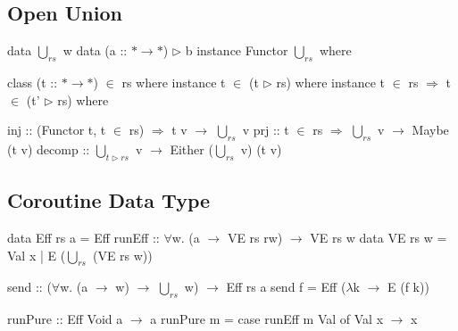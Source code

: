 \documentclass{article}
\newcommand{\U}{\bigcup\nolimits}
\begin{document}
\subsection*{Open Union}
\begin{code}
data $\U_{rs}$ w
data (a :: $* \to *$) $\rhd$ b
instance Functor  $\U_{rs}$ where

class (t :: $* \to *$) $\in$ rs where
instance t $\in$ (t $\rhd$ rs) where
instance t $\in$ rs $\Rightarrow$ t $\in$ (t' $\rhd$ rs) where

inj :: (Functor t, t $\in$ rs) $\Rightarrow$ t v $\to$ $\U_{rs}$ v
prj :: t $\in$ rs $\Rightarrow$ $\U_{rs}$ v $\to$ Maybe (t v)
decomp :: $\U_{t \rhd rs}$ v $\to$ Either ($\U_{rs}$ v) (t v)
\end{code}

\subsection*{Coroutine Data Type}
\begin{code}
data Eff rs a = Eff { runEff :: $\forall$w. (a $\to$ VE rs rw) $\to$ VE rs w }
data VE rs w = Val x
                     | E ($\U_{rs}$ (VE rs w))

send :: ($\forall$w. (a $\to$ w) $\to$ $\U_{rs}$ w) $\to$ Eff rs a
send f = Eff ($\lambda$k $\to$ E (f k))

runPure :: Eff Void a $\to$ a
runPure m = case runEff m Val of
  Val x $\to$ x
\end{code}
\end{document}
